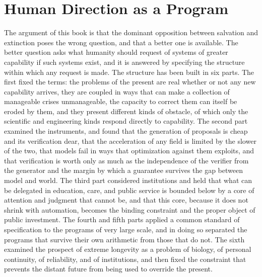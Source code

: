 \chapter{Human Direction as a Program}
\label{ch:32}

The argument of this book is that the dominant opposition between salvation and extinction poses the wrong question, and that a better one is available. The better question asks what humanity should request of systems of greater capability if such systems exist, and it is answered by specifying the structure within which any request is made. The structure has been built in six parts. The first fixed the terms: the problems of the present are real whether or not any new capability arrives, they are coupled in ways that can make a collection of manageable crises unmanageable, the capacity to correct them can itself be eroded by them, and they present different kinds of obstacle, of which only the scientific and engineering kinds respond directly to capability. The second part examined the instruments, and found that the generation of proposals is cheap and its verification dear, that the acceleration of any field is limited by the slower of the two, that models fail in ways that optimization against them exploits, and that verification is worth only as much as the independence of the verifier from the generator and the margin by which a guarantee survives the gap between model and world. The third part considered institutions and held that what can be delegated in education, care, and public service is bounded below by a core of attention and judgment that cannot be, and that this core, because it does not shrink with automation, becomes the binding constraint and the proper object of public investment. The fourth and fifth parts applied a common standard of specification to the programs of very large scale, and in doing so separated the programs that survive their own arithmetic from those that do not. The sixth examined the prospect of extreme longevity as a problem of biology, of personal continuity, of reliability, and of institutions, and then fixed the constraint that prevents the distant future from being used to override the present.

